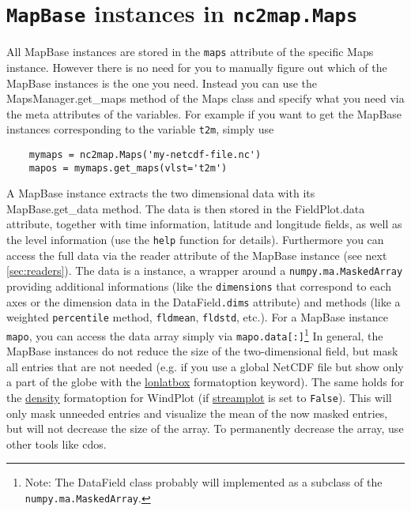 \section{\texttt{MapBase} instances in \texttt{nc2map.Maps}} \label{sec:MapBase}
All \gls{MapBase} instances are stored in the \lstinline|maps| attribute of the specific \gls{Maps} instance. However there is no need for you to manually figure out which of the \gls{MapBase} instances is the one you need. Instead you can use the \gls{MapsManager.get_maps} method of the \gls{Maps} class and specify what you need via the meta attributes of the variables. For example if you want to get the \gls{MapBase} instances corresponding to the variable \lstinline|t2m|, simply use
\begin{lstlisting}
	mymaps = nc2map.Maps('my-netcdf-file.nc')
	mapos = mymaps.get_maps(vlst='t2m')
\end{lstlisting}
A MapBase instance extracts the two dimensional data with its \gls{MapBase.get_data} method. The data is then stored in the \gls{FieldPlot.data} attribute, together with \gls{time} information, latitude and longitude fields, as well as the \gls{level} information (use the \lstinline|help| function for details). Furthermore you can access the full data via the \gls{reader} attribute of the \gls{MapBase} instance (see next \autoref{sec:readers}). The data is a  instance, a wrapper around a \lstinline|numpy.ma.MaskedArray| providing additional informations (like the \lstinline|dimensions| that correspond to each axes or the dimension data in the \gls{DataField}\lstinline|.dims| attribute) and methods (like a weighted \lstinline|percentile| method, \lstinline|fldmean|, \lstinline|fldstd|, etc.). For a \gls{MapBase} instance \lstinline|mapo|, you can access the data array simply via
\lstinline|mapo.data[:]|\footnote{Note: The \gls{DataField} class probably will implemented as a subclass of the \lstinline|numpy.ma.MaskedArray|.} In general, the \gls{MapBase} instances do not reduce the size of the two-dimensional field, but mask all entries that are not needed (e.g. if you use a global NetCDF file but show only a part of the globe with the \hyperref[item:lonlatbox]{lonlatbox} formatoption keyword). The same holds for the \hyperref[item:density]{density} formatoption for \gls{WindPlot} (if \hyperref[item:streamplot]{streamplot} is set to \lstinline|False|). This will only mask unneeded entries and visualize the mean of the now masked entries, but will not decrease the size of the array. To permanently decrease the array, use other tools like \glspl{cdo}.
